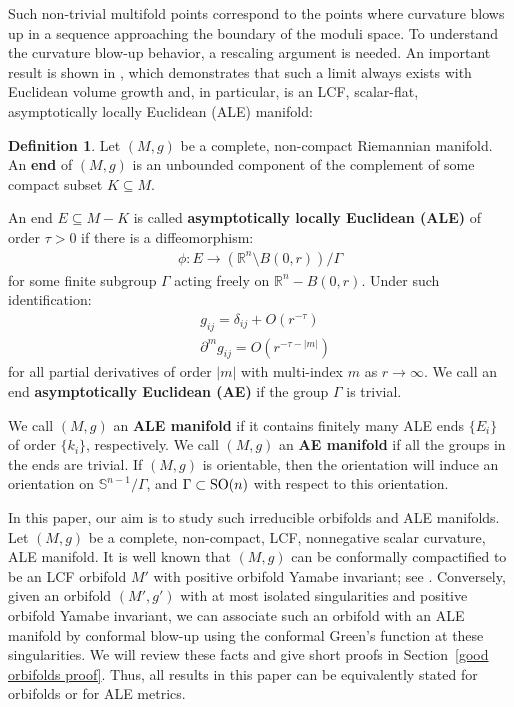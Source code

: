 \documentclass[12pt]{amsart}
\theoremstyle{definition}
\newtheorem{definition}[theorem]{Definition}
\begin{document}
Such non-trivial multifold points correspond to the points where curvature blows up in a sequence approaching the boundary of the moduli space. To understand the curvature blow-up behavior, a rescaling argument is needed. An important result is shown in \cite{TV3}, which demonstrates that such a limit always exists with Euclidean volume growth and, in particular, is an LCF, scalar-flat, asymptotically locally Euclidean (ALE) manifold:

\begin{definition}\label{def ALE} Let $(M,g)$ be a complete, non-compact Riemannian manifold. An \textbf{end} of $(M,g)$ is an unbounded component of the complement of some compact subset $K\subseteq M$. 

An end $E\subseteq M- K$ is called 
    \textbf{asymptotically locally Euclidean (ALE)} of order $\tau >0$ if there is a diffeomorphism:
\begin{align*}
     \phi: E\to (\mathbb{R}^n\setminus B(0,r))/\Gamma
\end{align*}
for some finite subgroup $\Gamma$ acting freely on $\mathbb{R}^n-B(0,r)$. Under such identification:
\begin{align*}
     &g_{ij}=\delta_{ij}+O(r^{-\tau})\\
     &\partial^{m}g_{ij}=O(r^{-\tau-|m|})
\end{align*}
for all partial derivatives of order $|m|$ with multi-index $m$ as $r\to\infty$. We call an end \textbf{asymptotically Euclidean (AE)} if the group $\Gamma$ is trivial.

We call $(M,g)$ an \textbf{ALE manifold} if it contains finitely many ALE ends $\{E_i\}$ of order $\{k_i\}$, respectively. We call $(M,g)$ an \textbf{AE manifold} if all the groups in the ends are trivial. If $(M,g)$ is orientable, then the orientation will induce an orientation on $\mathbb{S}^{n-1}/\Gamma$, and $\Gamma\subset{\rm{SO}}(n)$ with respect to this orientation.

\end{definition}

In this paper, our aim is to study such irreducible orbifolds and ALE manifolds. 
Let $(M,g)$ be a complete, non-compact, LCF, nonnegative scalar curvature, ALE manifold. It is well known that $(M,g)$ can be conformally compactified to be an LCF orbifold $M'$ with positive orbifold Yamabe invariant; see \cite{TV2}. Conversely, given an orbifold $(M',g')$ with at most isolated singularities and positive orbifold Yamabe invariant, we can associate such an orbifold with an ALE manifold by conformal blow-up using the conformal Green's function at these singularities. We will review these facts and give short proofs in Section~\ref{good orbifolds proof}.
Thus, all results in this paper can be equivalently stated for orbifolds or for ALE metrics. 
\end{document}

